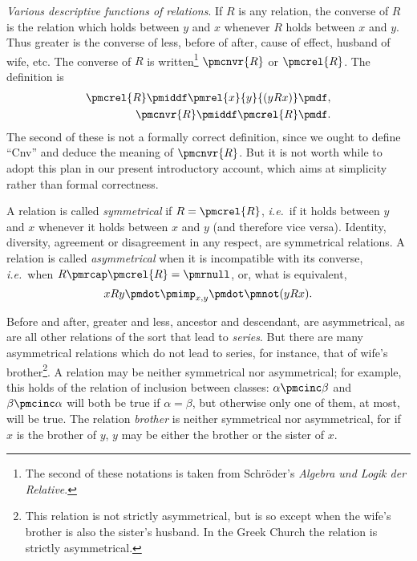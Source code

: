 \documentclass[letterpaper,12pt,openany,leqno]{book}
\newcommand{\pagefirst}[1]{\marginnote[\boxed{\text{#1}}]{\boxed{\text{#1}}}}
\begin{document}
\textit{Various descriptive functions of relations}. If $R$ is any relation, the converse of $R$ is the relation which holds between $y$ and $x$ whenever $R$ holds between $x$ and $y$. Thus greater is the converse of less, before of after, cause of effect, husband of wife, etc. The converse of $R$ is written\footnote{The second of these notations is taken from Schr{\"o}der's \textit{Algebra und Logik der Relative}.} $\pmcnvr{R}$ or $\pmcrel{R}$. The definition is
\begin{align*}
	\pmcrel{R} \pmiddf \pmrel{x}{y}{(yRx)} \pmdf, \\
	\pmcnvr{R} \pmiddf \pmcrel{R} \pmdf.
\end{align*}
The second of these is not a formally correct definition, since we ought to define ``Cnv'' and deduce the meaning of $\pmcnvr{R}$. But it is not worth while to adopt this plan in our present introductory account, which aims at simplicity rather than formal correctness.

A relation is called \textit{symmetrical} if $R = \pmcrel{R}$, \textit{i.e.}\ if it holds between $y$ and $x$ whenever it holds between $x$ and $y$ (and therefore vice versa). Identity, \pagefirst{34} diversity, agreement or disagreement in any respect, are symmetrical relations. A relation is called \textit{asymmetrical} when it is incompatible with its converse, \textit{i.e.}\ when $R\pmrcap \pmcrel{R} = \pmrnull$, or, what is equivalent,
\[
	xRy \pmdot \pmimp_{x,y} \pmdot \pmnot(yRx).
\]

Before and after, greater and less, ancestor and descendant, are asymmetrical, as are all other relations of the sort that lead to \textit{series}. But there are many asymmetrical relations which do not lead to series, for instance, that of wife's brother\footnote{This relation is not strictly asymmetrical, but is so except when the wife's brother is also the sister's husband. In the Greek Church the relation is strictly asymmetrical.}. A relation may be neither symmetrical nor asymmetrical; for example, this holds of the relation of inclusion between classes: $\alpha \pmcinc \beta$ and $\beta \pmcinc \alpha$ will both be true if $\alpha = \beta$, but otherwise only one of them, at most, will be true. The relation \textit{brother} is neither symmetrical nor asymmetrical, for if $x$ is the brother of $y$, $y$ may be either the brother or the sister of $x$.
\end{document}
